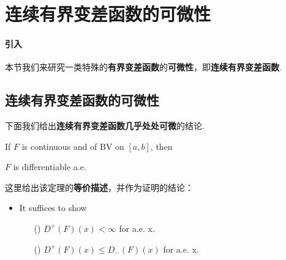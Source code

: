 \newpage
\section{连续有界变差函数的可微性}
\paragraph{引入}
	本节我们来研究一类特殊的\textbf{有界变差函数}的\textbf{可微性}，即\textbf{连续有界变差函数}.

\subsection{连续有界变差函数的可微性}
	下面我们给出\textbf{连续有界变差函数几乎处处可微}的结论.
	\begin{thm}\label{thm 4.6.1}
		If $F$ is continuous and of BV on $[a , b]$, then
		\begin{center}
			$F$ is differentiable a.e.
		\end{center}
	
		\vspace{2em}
		\begin{rmk}
			这里给出该定理的\textbf{等价描述}，并作为证明的结论：
			\begin{itemize}
				\item It suffices to show
				\begin{enumerate}
					\item[(\rmnum{1})]$D^{+}(F)(x) < \infty$ for a.e. x.
					
					\item[(\rmnum{2})]$D^{+}(F)(x) \leq D_{-}(F)(x)$ for a.e. x.
				\end{enumerate}
				

\end{itemize}
\end{rmk}
\end{thm}
